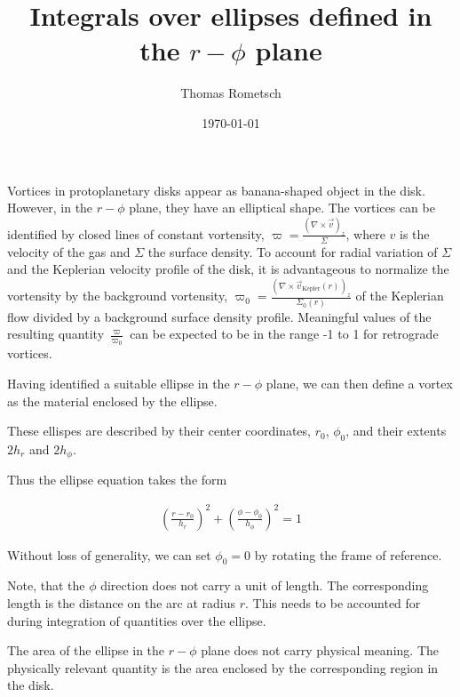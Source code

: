\documentclass[a4paper]{scrartcl}
\begin{document}
\title{Integrals over ellipses defined in the $r-\phi$ plane}

\author{Thomas Rometsch}

\date{\today}

\maketitle
%



Vortices in protoplanetary disks appear as banana-shaped object in the disk.
However, in the $r-\phi$ plane, they have an elliptical shape.
The vortices can be identified by closed lines of constant vortensity, 
$\varpi = \frac{(\nabla \times \vec{v})_z}{\Sigma}$,
where $v$ is the velocity of the gas and $\Sigma$ the surface density.
To account for radial variation of $\Sigma$ and the Keplerian velocity profile of the disk,
it is advantageous to normalize the vortensity by the background vortensity, 
$\varpi_0 = \frac{(\nabla \times \vec{v}_\mathrm{Kepler}(r))_z}{\Sigma_0(r)}$
of the Keplerian flow divided by a background surface density profile.
Meaningful values of the resulting quantity $\frac{\varpi}{\varpi_0}$ can be expected to be in the range -1 to 1
for retrograde vortices.

Having identified a suitable ellipse in the $r-\phi$ plane, 
we can then define a vortex as the material enclosed by the ellipse.

These ellispes are described by their center coordinates, $r_0$, $\phi_0$, and their extents
$2h_r$ and $2h_\phi$.

Thus the ellipse equation takes the form

\begin{align}\label{eqn:ellipse_equation}
  \left( \frac{r - r_0}{h_r} \right)^2 + \left( \frac{\phi - \phi_0}{h_\phi} \right)^2 = 1
\end{align}

Without loss of generality, we can set $\phi_0 = 0$ by rotating the frame of reference.

Note, that the $\phi$ direction does not carry a unit of length.
The corresponding length is the distance on the arc at radius $r$.
This needs to be accounted for during integration of quantities over the ellipse.

The area of the ellipse in the $r-\phi$ plane does not carry physical meaning.
The physically relevant quantity is the area enclosed by the corresponding region in the disk.
\end{document}
